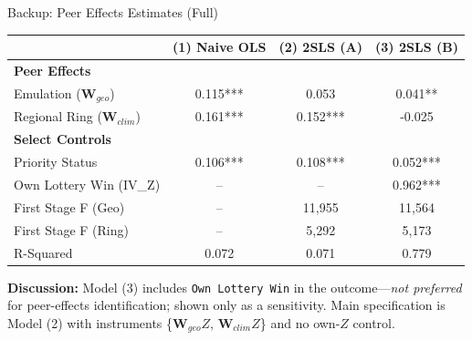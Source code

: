 \documentclass[10pt]{beamer}
\begin{document}
\begin{frame}[label=backup_peer_effects]{Backup: Peer Effects Estimates (Full)}
  \centering
  \scriptsize
  \begin{tabular}{l c c c}
    \toprule
    & \textbf{(1) Naive OLS} & \textbf{(2) 2SLS (A)} & \textbf{(3) 2SLS (B)} \\
    \midrule
    \textbf{Peer Effects} & & & \\
    Emulation ($\mathbf{W}_{geo}$) & 0.115*** & 0.053 & 0.041** \\
    Regional Ring ($\mathbf{W}_{clim}$) & 0.161*** & 0.152*** & -0.025 \\
    \midrule
    \textbf{Select Controls} & & & \\
    Priority Status & 0.106*** & 0.108*** & 0.052*** \\
    Own Lottery Win (IV\_Z) & -- & -- & 0.962*** \\
    \midrule
    First Stage F (Geo) & -- & 11,955 & 11,564 \\
    First Stage F (Ring) & -- & 5,292 & 5,173 \\
    R-Squared & 0.072 & 0.071 & 0.779 \\
    \bottomrule
  \end{tabular}
  
  \vspace{1em}
  \normalsize
  \textbf{Discussion:} Model (3) includes \texttt{Own Lottery Win} in the outcome—\textit{not preferred} for peer-effects identification; shown only as a sensitivity. Main specification is Model (2) with instruments \{$\mathbf{W}_{geo}Z$, $\mathbf{W}_{clim}Z$\} and no own-$Z$ control.
  
  \vspace{0.5em}
  \hyperlink{main_results}{}
\end{frame}
\end{document}
